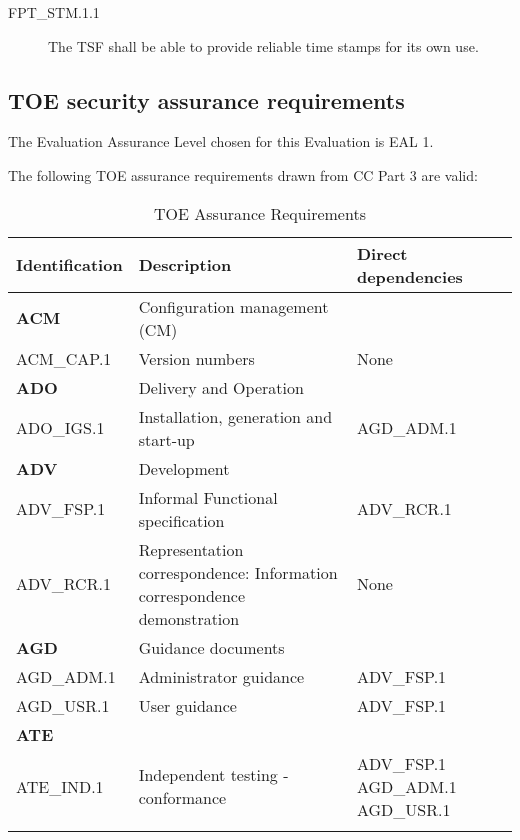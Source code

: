 \documentclass[12pt,english]{scrbook}
\begin{document}



\begin{description}
\item[FPT{\_}STM.1.1]

The TSF shall be able to provide reliable time stamps for its own use.

\end{description}





\subsection{TOE security assurance requirements}

The Evaluation Assurance Level chosen for this Evaluation is EAL 1.

The following TOE assurance requirements drawn from CC Part 3 are valid:


\begin{longtable}[c]{lp{7cm}p{3cm}}
  \toprule
  Identification & Description & Direct dependencies\\
  \midrule \endhead

  \textbf{ACM} & Configuration management (CM) &  \\
  ACM{\_}CAP.1 & Version numbers & None \\

  \textbf{ADO} & Delivery and Operation &  \\
  ADO{\_}IGS.1 & Installation, generation and start-up & AGD{\_}ADM.1 \\
  
  \textbf{ADV} & Development &  \\
  ADV{\_}FSP.1 & Informal Functional specification & ADV{\_}RCR.1 \\

  ADV{\_}RCR.1 & Representation correspondence: Information correspondence
  demonstration & None \\ 

  \textbf{AGD} & Guidance documents &  \\
  AGD{\_}ADM.1 & Administrator guidance & ADV{\_}FSP.1 \\
  AGD{\_}USR.1 & User guidance & ADV{\_}FSP.1 \\
  \textbf{ATE} &  &  \\ 
  ATE{\_}IND.1 & Independent testing - conformance & ADV{\_}FSP.1 AGD{\_}ADM.1 AGD{\_}USR.1 \\


  \bottomrule
  \caption{TOE Assurance Requirements}
            
\end{longtable}
\end{document}
